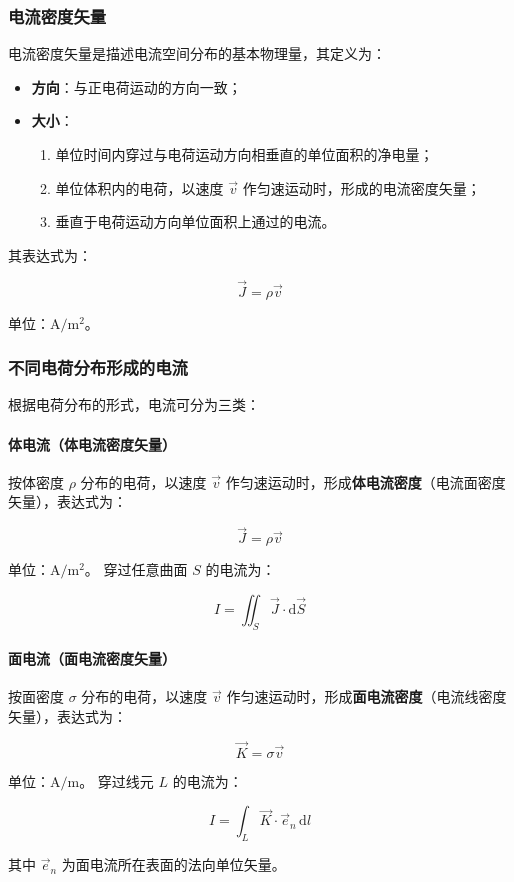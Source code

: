 \subsubsection{电流密度矢量}
电流密度矢量是描述电流空间分布的基本物理量，其定义为：
\begin{itemize}
    \item \textbf{方向}：与正电荷运动的方向一致；
    \item \textbf{大小}：
    \begin{enumerate}
        \item 单位时间内穿过与电荷运动方向相垂直的单位面积的净电量；
        \item 单位体积内的电荷，以速度 $\vec{v}$ 作匀速运动时，形成的电流密度矢量；
        \item 垂直于电荷运动方向单位面积上通过的电流。
    \end{enumerate}
\end{itemize}

其表达式为：
\begin{formulaBox}
\[
\vec{J} = \rho \vec{v}
\]
\end{formulaBox}
单位：$\mathrm{A/m^2}$。

\subsubsection{不同电荷分布形成的电流}
根据电荷分布的形式，电流可分为三类：

\paragraph{体电流（体电流密度矢量）}
按体密度 $\rho$ 分布的电荷，以速度 $\vec{v}$ 作匀速运动时，形成\textbf{体电流密度}（电流面密度矢量），表达式为：
\begin{formulaBox}
\[
\vec{J} = \rho \vec{v}
\]
\end{formulaBox}
单位：$\mathrm{A/m^2}$。
穿过任意曲面 $S$ 的电流为：
\begin{formulaBox}
\[
I = \iint_S \vec{J} \cdot \mathrm{d}\vec{S}
\]
\end{formulaBox}

\paragraph{面电流（面电流密度矢量）}
按面密度 $\sigma$ 分布的电荷，以速度 $\vec{v}$ 作匀速运动时，形成\textbf{面电流密度}（电流线密度矢量），表达式为：
\begin{formulaBox}
\[
\vec{K} = \sigma \vec{v}
\]
\end{formulaBox}
单位：$\mathrm{A/m}$。
穿过线元 $L$ 的电流为：
\begin{formulaBox}
\[
I = \int_L \vec{K} \cdot \vec{e}_n \, \mathrm{d} l
\]
\end{formulaBox}
其中 $\vec{e}_n$ 为面电流所在表面的法向单位矢量。

